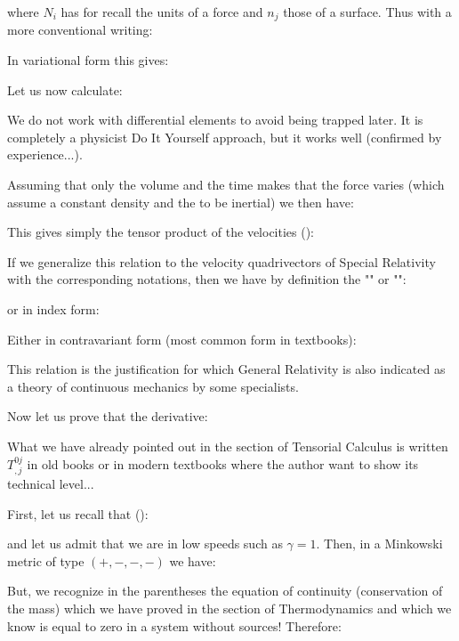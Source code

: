 	where $N_i$ has for recall the units of a force and $n_j$ those of a surface. Thus with a more conventional writing:
	
	In variational form this gives:
	
	Let us now calculate:
	
	\begin{tcolorbox}[title=Remark,colframe=black,arc=10pt]
	We do not work with differential elements to avoid being trapped later. It is completely a physicist Do It Yourself approach, but it works well (confirmed by experience...).
	\end{tcolorbox}
	Assuming that only the volume and the time makes that the force varies (which assume a constant density and the to be inertial) we then have:
	
	This gives simply the tensor product of the velocities ():
	
	If we generalize this relation to the velocity quadrivectors of Special Relativity with the corresponding notations, then we have by definition the "" or "":
	
	or in index form:
	
	Either in contravariant form (most common form in textbooks):
	
	This relation is the justification for which General Relativity is also indicated as a theory of continuous mechanics by some specialists.

	Now let us prove that the derivative:
	
	\begin{tcolorbox}[title=Remark,colframe=black,arc=10pt]
	What we have already pointed out in the section of Tensorial Calculus is written $T^{0j}_{,j}$ in old books or in modern textbooks where the author want to show its technical level...
	\end{tcolorbox}	
	First, let us recall that ():
	
	and let us admit that we are in low speeds such as $\gamma=1$. Then, in a Minkowski metric of type $(+, -, -, -)$ we have:
	
	But, we recognize in the parentheses the equation of continuity (conservation of the mass) which we have proved in the section of Thermodynamics and which we know is equal to zero in a system without sources! Therefore:
	
